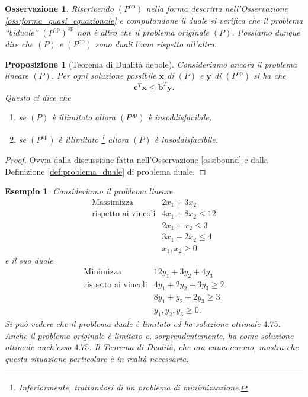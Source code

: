 \documentclass[italian, 12pt, reqno]{article}
\theoremstyle{myteo}
\newtheorem{proposition}[theorem]{Proposizione}
\newtheorem{example}[theorem]{Esempio}
\newtheorem{remark}[theorem]{Osservazione}
\numberwithin{equation}{section}
\newcommand{\dual}[1]{#1^{\text{op}}}
\begin{document}
\begin{remark}
  \label{oss:duale_del_duale}
  Riscrivendo \((\dual{P})\) nella forma descritta nell'Osservazione \ref{oss:forma_quasi_equazionale} e computandone il duale si verifica che il problema ``biduale'' \((\dual{P})^{\text{op}}\) non è altro che il problema originale \((P)\).
  Possiamo dunque dire che \((P)\) e \((\dual{P})\) sono duali l'uno rispetto all'altro.
\end{remark}

\begin{proposition}[Teorema di Dualità debole]
  \label{prop:dualità_debole}
  Consideriamo ancora il problema lineare \((P)\).
  Per ogni soluzione possibile \(\mathbf{x}\) di \((P)\) e \(\mathbf{y}\) di \((\dual{P})\) si ha che
  \[\mathbf{c}^T\mathbf{x} \leq \mathbf{b}^T\mathbf{y}.\]
  Questo ci dice che
  \begin{enumerate}
  \item se \((P)\) è illimitato allora \((\dual{P})\) è insoddisfacibile,
  \item se \((\dual{P})\) è illimitato \footnote{Inferiormente, trattandosi di un problema di minimizzazione.} allora \((P)\) è insoddisfacibile.
  \end{enumerate}
\end{proposition}

\begin{proof}
  Ovvia dalla discussione fatta nell'Osservazione \ref{oss:bound} e dalla Definizione \ref{def:problema_duale} di problema duale.
\end{proof}

\begin{example}
  \label{es:problema_duale}
  Consideriamo il problema lineare
  \begin{equation*}
    \begin{array}{ll}
      \text{Massimizza} & 2x_1 + 3x_2\\
      \text{rispetto ai vincoli} & 4x_1 + 8x_2 \leq 12\\
                        & 2x_1 + x_2 \leq 3\\
                        & 3x_1 + 2x_2 \leq 4\\
                        & x_1, x_2\geq 0
    \end{array}
  \end{equation*}
  e il suo duale
  \begin{equation*}
    \begin{array}{ll}
      \text{Minimizza} & 12y_1 + 3y_2 + 4y_3\\
      \text{rispetto ai vincoli} & 4y_1 + 2y_2 + 3y_3 \geq 2\\
                       & 8y_1 + y_2 + 2 y_3 \geq 3\\
                       & y_1, y_2, y_3 \geq 0.
    \end{array}
  \end{equation*}
  Si può vedere che il problema duale è limitato ed ha soluzione ottimale \(4.75\).
  Anche il problema originale è limitato e, sorprendentemente, ha come soluzione ottimale anch'esso \(4.75\).
  Il Teorema di Dualità, che ora enuncieremo, mostra che questa situazione particolare è in realtà necessaria.
\end{example}
\end{document}
